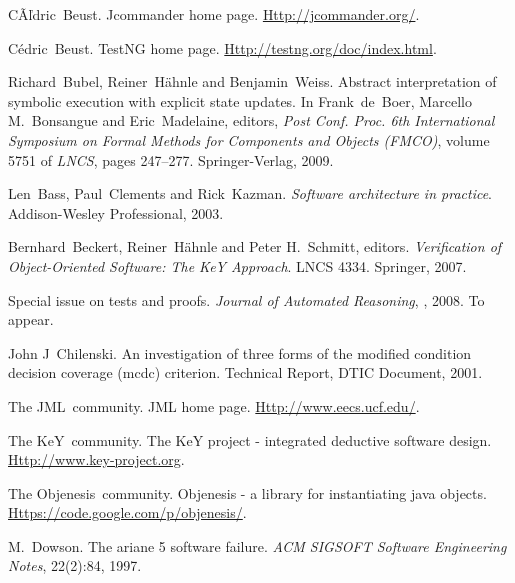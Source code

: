 \documentclass{article}
\newcommand{\tmtextit}[1]{{\itshape{#1}}}
\begin{document}
\begin{thebibliography}{10}
  C{\~A}{\v l}dric~Beust.{\newblock} Jcommander
  home page.{\newblock} {\url{Http://jcommander.org/}}.{\newblock}
  
  C{\'e}dric~Beust.{\newblock} TestNG home
  page.{\newblock} {\url{Http://testng.org/doc/index.html}}.{\newblock}
  
  Richard~Bubel, Reiner~H{\"a}hnle and
  Benjamin~Weiss.{\newblock} Abstract interpretation of symbolic execution
  with explicit state updates.{\newblock} In Frank~de~Boer, Marcello
  M.~Bonsangue and Eric~Madelaine, editors, \tmtextit{Post Conf. Proc. 6th
  International Symposium on Formal Methods for Components and Objects
  (FMCO)}, volume 5751 of \tmtextit{LNCS}, pages 247--277. Springer-Verlag,
  2009.{\newblock}
  
  Len~Bass, Paul~Clements and
  Rick~Kazman.{\newblock} \tmtextit{Software architecture in
  practice}.{\newblock} Addison-Wesley Professional, 2003.{\newblock}
  
  Bernhard~Beckert, Reiner~H{\"a}hnle and Peter
  H.~Schmitt, editors.{\newblock} \tmtextit{Verification of Object-Oriented
  Software: The KeY Approach}.{\newblock} LNCS 4334. Springer,
  2007.{\newblock}
  
  Special issue on tests and proofs.{\newblock}
  \tmtextit{Journal of Automated Reasoning}, , 2008.{\newblock} To
  appear.{\newblock}
  
  John J~Chilenski.{\newblock} An
  investigation of three forms of the modified condition decision coverage
  (mcdc) criterion.{\newblock} Technical Report, DTIC Document,
  2001.{\newblock}
  
  The JML~community.{\newblock} JML home
  page.{\newblock} {\url{Http://www.eecs.ucf.edu/}}.{\newblock}
  
  The KeY~community.{\newblock} The KeY project -
  integrated deductive software design.{\newblock}
  {\url{Http://www.key-project.org}}.{\newblock}
  
  The Objenesis~community.{\newblock} Objenesis
  - a library for instantiating java objects.{\newblock}
  {\url{Https://code.google.com/p/objenesis/}}.{\newblock}
  
  M.~Dowson.{\newblock} The ariane 5 software
  failure.{\newblock} \tmtextit{ACM SIGSOFT Software Engineering Notes},
  22(2):84, 1997.{\newblock}
  

\end{thebibliography}
\end{document}

